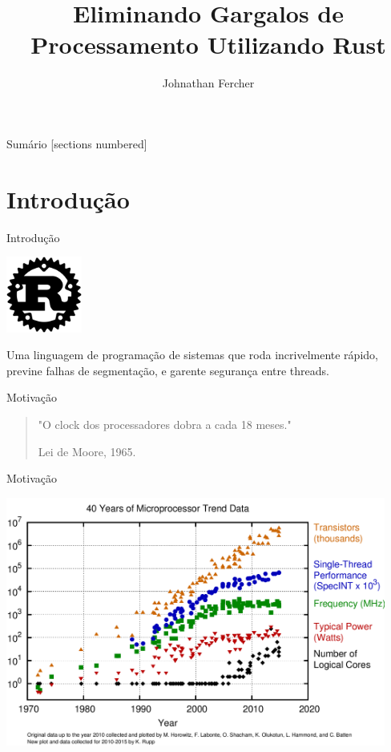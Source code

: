 \documentclass[aspectratio=169]{beamer}
\title{Eliminando Gargalos de Processamento \newline Utilizando Rust}
\date{}
\author{Johnathan Fercher}
\begin{document}
\maketitle

\begin{frame}{Sumário}
  [sections numbered]
  \tableofcontents[hideallsubsections]
\end{frame}

\section{Introdução}
\begin{frame}{Introdução}
	\begin{center}
		\includegraphics[width=2.5cm]{imgs/rust.png}
	\end{center}

	Uma linguagem de programação de sistemas que roda incrivelmente rápido, previne falhas de segmentação, e garente segurança entre threads.
\end{frame}

\begin{frame}{Motivação}
	\begin{quote}
		\hspace{0.5cm}"O clock dos processadores dobra a cada 18 meses."
		
		\hspace{8.2cm}Lei de Moore, 1965.
	\end{quote}
\end{frame}

\begin{frame}{Motivação}
	\begin{center}
		\includegraphics[width=12.5cm]{imgs/cores-history.png}
	\end{center}
\end{frame}
\end{document}

